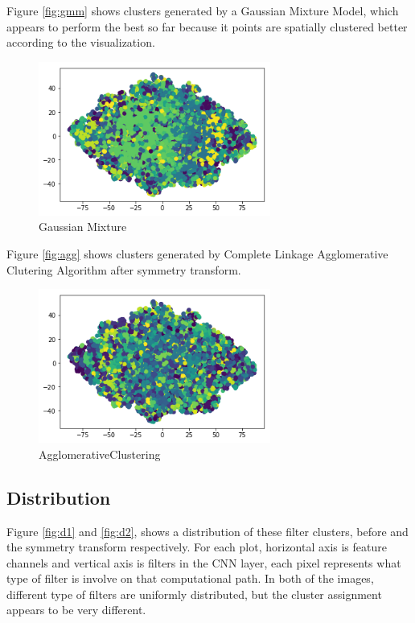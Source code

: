 \documentclass{article} %
\begin{document}
Figure \ref{fig:gmm} shows clusters generated by a Gaussian Mixture Model,
which appears to perform the best so far because it points are spatially clustered better
according to the visualization.

\begin{figure}[H]
	\centering
	\includegraphics[width=3in]{Figures/ul5.png}
	\caption{Gaussian Mixture}
	\label{fig:gmm2}
\end{figure}

Figure \ref{fig:agg} shows clusters generated by Complete Linkage Agglomerative Clutering
Algorithm after symmetry transform.

\begin{figure}[H]
	\centering
	\includegraphics[width=3in]{Figures/ul6.png}
	\caption{AgglomerativeClustering}
	\label{fig:agg2}
\end{figure}

\subsection{Distribution}

Figure \ref{fig:d1} and \ref{fig:d2}, shows a distribution of these filter clusters, before and the symmetry transform respectively.
For each plot, horizontal axis is feature channels and vertical axis is filters in the CNN layer,
each pixel represents what type of filter is involve on that computational path.
In both of the images, different type of filters are uniformly distributed, but the cluster assignment appears to be very different.
\end{document}
